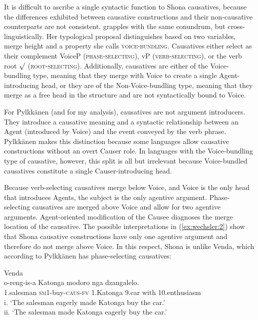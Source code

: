 \documentclass[output=paper,modfonts,nonflat,colorlinks,citecolor=brown]{langsci/langscibook}
\begin{document}
It is difficult to ascribe a single syntactic function to Shona causatives, because the differences exhibited between causative constructions and their non-causative counterparts are not consistent. \citet{Pylkkänen2008} grapples with the same conundrum, but cross-linguistically. Her typological proposal distinguishes based on two variables, merge height and a property she calls \textsc{voice-bundling.} Causatives either select as their complement VoiceP  (\textsc{phase-selecting)}, vP \textsc{(verb-selecting)}, or the verb root ${\surd}$ (\textsc{root-selecting)}. Additionally, causatives are either of the Voice-bundling type, meaning that they merge with Voice to create a single Agent-introducing head, or they are of the Non-Voice-bundling type, meaning that they merge as a free head in the structure and are not syntactically bound to Voice. 

For Pylkkänen (and for my analysis), causatives are not argument introducers. They introduce a causative meaning and a syntactic relationship between an Agent (introduced by Voice) and the event conveyed by the verb phrase. Pylkkänen makes this distinction because some languages allow causative constructions without an overt Causer role. In languages with the Voice-bundling type of causative, however, this split is all but irrelevant because Voice-bundled causatives constitute a single Causer-introducing head. 

Because verb-selecting causatives merge below Voice, and Voice is the only head that introduces Agents, the subject is the only agentive argument. Phase-selecting causatives are merged above Voice and allow for two agentive arguments. Agent-oriented modification of the Causee diagnoses the merge location of the causative. The possible interpretations in (\ref{ex:wechsler:2}) show that Shona causative constructions have only one agentive argument and therefore do not merge above Voice. In this respect, Shona is unlike Venda, which according to Pylkkänen has phase-selecting causatives:

\ea\label{ex:wechsler:3}
Venda \citep[83]{Pylkkänen2008}\\
 {o-reng-is-a} {Katonga} {modoro} {nga} {dzangalelo}.\\
1.salesman \textsc{sm1-}buy\textsc{-caus-fv} 1.Katonga 9.car with 10.enthusiasm\\
\glt i. ‘The salesman eagerly made Katonga buy the car.’\\
ii. ‘The salesman made Katonga eagerly buy the car.’
\z
\end{document}
